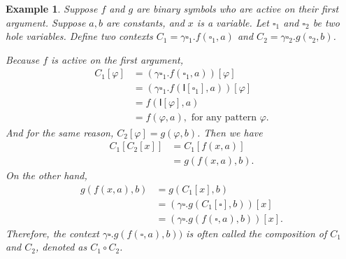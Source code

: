 \documentclass{article}
\theoremstyle{plain}
\newtheorem{eg}[thm]{Example}
\def\I{\textsf{I}}
\begin{document}
\begin{eg}
	Suppose $f$ and $g$ are binary symbols who are active on their first argument. Suppose $a, b$ are constants, and $x$ is a variable. Let $\square_1$ and $\square_2$ be two hole variables. Define two contexts $C_1 = \gamma \square_1 . f(\square_1, a)$ and $C_2 = \gamma \square_2 . g(\square_2, b)$. 
	
	Because $f$ is active on the first argument, 
	\begin{align*}
       C_1[\varphi]
       &= (\gamma \square_1 . f(\square_1, a)) [\varphi] \\
       &= (\gamma \square_1 . f(\I[\square_1], a)) [\varphi] \\
       &= f(\I[\varphi], a) \\
       &= f(\varphi, a), \text{ for any pattern $\varphi$.}
	\end{align*}
	And for the same reason, $C_2[\varphi] = g(\varphi, b)$. Then we have
	\begin{align*}
	C_1[C_2[x]]
	&= C_1[f(x,a)] \\
	&= g(f(x,a), b).
	\end{align*}
	On the other hand, 
	\begin{align*}
    g(f(x,a), b)
    &= g(C_1[x], b) \\
    &= (\gamma \square . g(C_1[\square], b))[x] \\
    &= (\gamma \square . g(f(\square, a), b))[x].
	\end{align*}
	Therefore, the context $\gamma \square . g(f(\square, a), b))$ is often called the \emph{composition} of $C_1$ and $C_2$, denoted as $C_1 \circ C_2$.

\end{eg}
\end{document}
